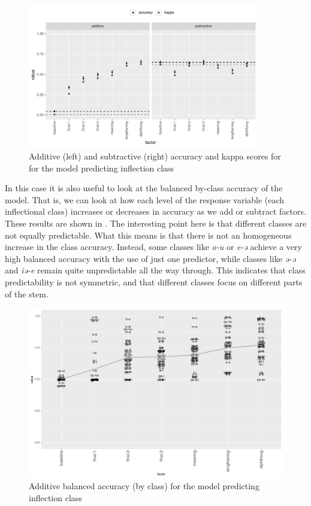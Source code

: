 \begin{figure}
  \centering
  \includegraphics[width=0.9\textwidth]{./figures/kasem/p-fi-class-sg-overall.pdf}
    \caption{Additive (left) and subtractive (right) accuracy and kappa scores for for the model predicting inflection class}\label{fig:overall-fi-class-sg}
\end{figure}

In this case it is also useful to look at the balanced by-class accuracy of the model. That is, we can look at how each level of the response variable (each inflectional class) increases or decreases in accuracy as we add or subtract factors. These results are shown in . The interesting point here is that different classes are not equally predictable. What this means is that there is not an homogeneous increase in the class accuracy. Instead, some classes like \textit{o-u} or \textit{e-ə} achieve a very high balanced accuracy with the use of just one predictor, while classes like \textit{ə-ə} and \textit{iə-e} remain quite unpredictable all the way through. This indicates that class predictability is not symmetric, and that different classes focus on different parts of the stem.

\begin{figure}
  \centering
  \includegraphics[width=0.85\textheight]{./figures/kasem/p-fi-class-sg-byclass.pdf}
  \caption{Additive balanced accuracy (by class) for the model predicting inflection class}\label{fig:byclass-fi-class-sg}
\end{figure}

